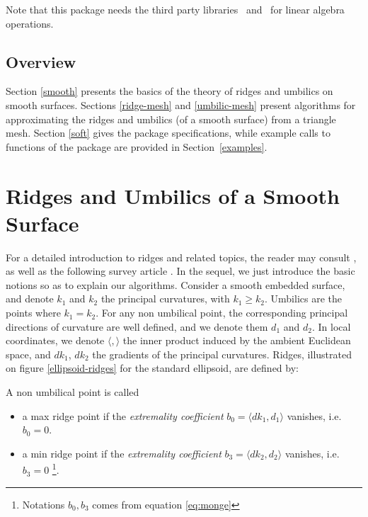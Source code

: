 Note that this package needs the third party libraries
\ccThirdPartyLapack\ and \ccThirdPartyBlas\ for linear algebra operations.

\subsection{Overview}

Section \ref{smooth} presents the basics of the theory of ridges and
umbilics on smooth surfaces. Sections \ref{ridge-mesh} and
\ref{umbilic-mesh} present algorithms for  approximating the ridges and
umbilics (of a smooth surface) from a triangle mesh. Section
\ref{soft} gives the package specifications, while example calls to
functions of the package are provided in Section~\ref{examples}.


\section{Ridges and Umbilics of a Smooth Surface\label{smooth}}

For a detailed introduction to ridges and related topics, the reader
may consult 
\cite{cgal:hgygm-ttdpf-99,cgal:p-gd-01}, as well as
the following survey article \cite{cgal:cp-ssulc-05}.
In the sequel, we just introduce the basic notions so as to explain
our algorithms.  Consider a smooth embedded surface, and denote $k_1$
and $k_2$ the principal curvatures, with $k_1\geq k_2$. Umbilics are
the points where $k_1=k_2$.  For any non umbilical point, the
corresponding principal directions of curvature are well defined, and
we denote them $d_1$ and $d_2$.
In local coordinates, we denote $\langle , \rangle$ the inner product
induced by the ambient Euclidean space, and $dk_1$, $dk_2$ the
gradients of the principal curvatures. Ridges, illustrated on figure
\ref{ellipsoid-ridges} for the standard ellipsoid, are defined by:

\begin{definition}
\label{def:ridge-extrema}
A non umbilical point is called
\begin{itemize}
\item
a max ridge point if the {\em extremality coefficient} $b_0=\langle
dk_1,d_1 \rangle$ vanishes, i.e. $b_0=0$.

\item a min ridge point if the {\em extremality coefficient}
  $b_3=\langle dk_2,d_2 \rangle$ vanishes, i.e. $b_3=0$
  \footnote{Notations $b_0, b_3$ comes from equation \ref{eq:monge} }.
\end{itemize}
\end{definition}

